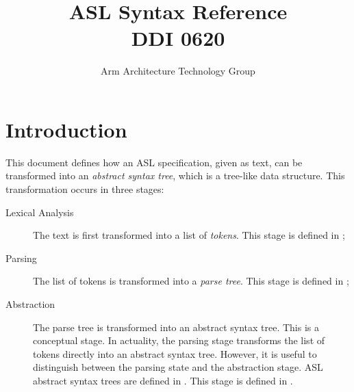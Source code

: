 \documentclass{book}
\author{Arm Architecture Technology Group}
\title{ASL Syntax Reference \\
       DDI 0620}
\begin{document}
\maketitle

\tableofcontents{}





\chapter{Introduction}
This document defines how an ASL specification, given as text, can be transformed into an \emph{abstract syntax tree},
which is a tree-like data structure. This transformation occurs in three stages:

\begin{description}
  \item[Lexical Analysis] The text is first transformed into a list of \emph{tokens}.
        This stage is defined in ;
  \item[Parsing] The list of tokens is transformed into a \emph{parse tree}.
        This stage is defined in ;
  \item[Abstraction] The parse tree is transformed into an abstract syntax tree. This is a conceptual stage. In actuality,
        the parsing stage transforms the list of tokens directly into an abstract syntax tree. However, it is useful to
        distinguish between the parsing state and the abstraction stage.
        ASL abstract syntax trees are defined in .
        This stage is defined in .
\end{description}

\newcommand\ReadEffect[0]{\textsf{ReadEffect}}
\newcommand\Normal[0]{\textsf{Normal}}
\newcommand\ThrowingConfig[0]{\texttt{\#T}}
\newcommand\OrAbnormal[0]{\terminateas \ThrowingConfig, \ErrorConfig}
\newcommand\vg[0]{\texttt{g}}
\newcommand\env[0]{\texttt{env}}
\newcommand\parallelcomp[0]{\parallel}
\newcommand\binoprel[0]{\texttt{binop}}
\newcommand\unoprel[0]{\texttt{unop}}
\newcommand\evalexprsef[1]{\hyperlink{def-evalexprsef}{\texttt{eval\_expr\_sef}}(#1)}
\newcommand\XGraphs[0]{\mathcal{G}}
\newcommand\TError[0]{\textsf{TDynError}}
\newcommand\ErrorConfig[0]{\hyperlink{def-errorconfig}{\texttt{\#DE}}}
\newcommand\annotaterel[0]{\textsf{type}}
\newcommand\typearrow[0]{\xrightarrow{\annotaterel}}
\newcommand\evalexpr[1]{\texttt{eval\_expr}(#1)}
\newcommand\vt[0]{\texttt{t}}
\newcommand\veone[0]{\texttt{e1}}
\newcommand\vetwo[0]{\texttt{e2}}
\newcommand\vvone[0]{\texttt{v1}}
\newcommand\vvtwo[0]{\texttt{v2}}
\newcommand\vl[0]{\texttt{l}}
\newcommand\vm[0]{\texttt{m}}
\newcommand\vmone[0]{\texttt{m1}}
\newcommand\vmtwo[0]{\texttt{m2}}

\end{document}

